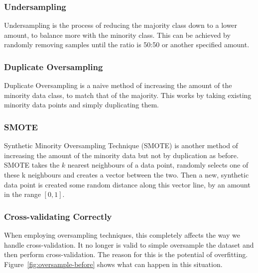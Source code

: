 \documentclass[12pt,a4paper,twoside]{report}
\begin{document}
\subsubsection{Undersampling}
Undersampling is the process of reducing the majority class down to a lower amount, to balance more with the minority class. This can be achieved by randomly removing samples until the ratio is 50:50 or another specified amount. 


\subsubsection{Duplicate Oversampling}
Duplicate Oversampling is a naive method of increasing the amount of the minority data class, to match that of the majority. This works by taking existing minority data points and simply duplicating them.

\subsubsection{SMOTE}
Synthetic Minority Oversampling Technique (SMOTE) is another method of increasing the amount of the minority data but not by duplication as before. SMOTE takes the $k$ nearest neighbours of a data point, randomly selects one of these k neighbours and creates a vector between the two. Then a new, synthetic data point is created some random distance along this vector line, by an amount in the range $[0,1]$.

\subsubsection{Cross-validating Correctly}
When employing oversampling techniques, this completely affects the way we handle cross-validation. It no longer is valid to simple oversample the dataset and then perform cross-validation. The reason for this is the potential of overfitting. Figure~\ref{fig:oversample-before} shows what can happen in this situation. 
\end{document}
